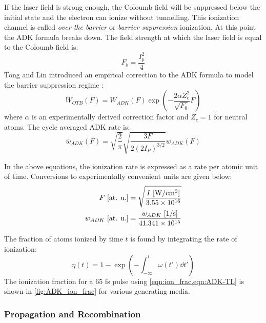 If the laser field is strong enough, the Coloumb field will be suppressed below the initial state and the electron can ionize without tunnelling. This ionization channel is called \textit{over the barrier} or \textit{barrier suppression} ionization. At this point the ADK formula breaks down. The field strength at which the laser field is equal to the Coloumb field is:
\begin{equation}
F_b = \frac{I_p^2}{4}
\end{equation}
Tong and Lin introduced an empirical correction to the ADK formula to model the barrier suppression regime \cite{tongEmpiricalFormulaStatic2005}:
\begin{equation}
W_{OTB} (F) = W_{ADK} (F) \exp \left( - \frac{2 \alpha Z_c^2}{\sqrt{F_0}} F \right)
\label{eqn:ADK-TL}
\end{equation}
where $\alpha$ is an experimentally derived correction factor and $Z_c=1$ for neutral atoms. The cycle averaged ADK rate is:
\begin{equation}
\bar{w}_{ADK} (F) = \sqrt{\frac{2}{\pi}} \sqrt{\frac{3 F}{2 (2 I_P)^{3/2}}} w_{ADK} (F)
\end{equation}

In the above equations, the ionization rate is expressed as a rate per atomic unit of time. Conversions to experimentally convenient units are given below:
\begin{align}
F \textrm{ [at. u.]} &= \sqrt{\frac{ I \textrm{ [W/cm\textsuperscript{2}]}}{3.55 \times 10^{16}}} \\
w_{ADK} \textrm{  [at. u.]} &= \frac{w_{ADK} \textrm{ [1/s]}}{41.341 \times 10^{15}}
\end{align}

The fraction of atoms ionized by time $t$ is found by integrating the rate of ionization:
\begin{equation}
\eta(t) = 1 - \exp \left( - \int_{-\infty}^{t} \omega(t') \dd{t'} \right)
\label{eqn:ion_frac}
\end{equation}
The ionization fraction for a 65 fs pulse using \cref{eqn:ion_frac,eqn:ADK-TL} is shown in \cref{fig:ADK_ion_frac} for various generating media.

\subsubsection{Propagation and Recombination}


